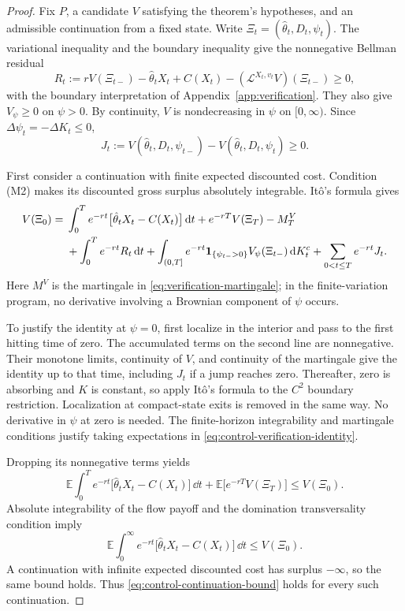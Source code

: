 \documentclass[12pt]{article}
\newcommand{\E}{\mathbb{E}}
\newcommand{\hth}{\hat\theta}
\begin{document}
\begin{proof}
Fix \(P\), a candidate \(V\) satisfying the theorem's hypotheses,
and an admissible continuation from a fixed state. Write
\(\Xi_t=(\hth_t,D_t,\psi_t)\). The variational inequality and the boundary inequality
give the nonnegative Bellman residual
\[
  R_t:=rV(\Xi_{t-})-\hth_tX_t+C(X_t)
       -(\mathcal L^{X_t,v_t}V)(\Xi_{t-})\geq0,
\]
with the boundary interpretation of
Appendix~\ref{app:verification}. They also give \(V_\psi\geq0\)
on \(\psi>0\). By continuity, \(V\) is nondecreasing in \(\psi\)
on \([0,\infty)\). Since \(\Delta\psi_t=-\Delta K_t\leq0\),
\[
  J_t:=V(\hth_t,D_t,\psi_{t-})-V(\hth_t,D_t,\psi_t)\geq0.
\]

First consider a continuation with finite expected discounted cost.
Condition (M2) makes its discounted gross surplus absolutely
integrable. It\^o's formula gives
\begin{align}
  V(\Xi_0)
  ={}&\int_0^T e^{-rt}
       \bigl[\hth_tX_t-C(X_t)\bigr]\,\dd t
       +e^{-rT}V(\Xi_T)-M_T^V \notag\\
    &+\int_0^T e^{-rt}R_t\,\dd t
       +\int_{(0,T]}e^{-rt}
          \mathbf 1_{\{\psi_{t-}>0\}}
          V_\psi(\Xi_{t-})\,\dd K_t^c
       +\sum_{0<t\leq T}e^{-rt}J_t.
  \label{eq:control-verification-identity}
\end{align}
Here \(M^V\) is the martingale in
\eqref{eq:verification-martingale}; in the finite-variation program,
no derivative involving a Brownian component of \(\psi\) occurs.

To justify the identity at \(\psi=0\), first localize in the interior
and pass to the first hitting time of zero. The accumulated terms on
the second line are nonnegative. Their monotone limits, continuity of
\(V\), and continuity of the martingale give the identity up to that
time, including \(J_t\) if a jump reaches zero. Thereafter, zero is
absorbing and \(K\) is constant, so apply It\^o's formula to the
\(C^2\) boundary restriction. Localization at compact-state exits
is removed in the same way. No derivative in \(\psi\) at zero is
needed. The finite-horizon integrability and martingale conditions
justify taking expectations in
\eqref{eq:control-verification-identity}.

Dropping its nonnegative terms yields
\[
  \E\int_0^T e^{-rt}\bigl[\hth_tX_t-C(X_t)\bigr]\,\dd t
  +\E\bigl[e^{-rT}V(\Xi_T)\bigr]
  \leq V(\Xi_0).
\]
Absolute integrability of the flow payoff and the domination
transversality condition imply
\begin{equation}\label{eq:control-continuation-bound}
  \E\int_0^\infty e^{-rt}
    \bigl[\hth_tX_t-C(X_t)\bigr]\,\dd t
  \leq V(\Xi_0).
\end{equation}
A continuation with infinite expected discounted cost has surplus
\(-\infty\), so the same bound holds. Thus \eqref{eq:control-continuation-bound} holds for every
such continuation.


\end{proof}
\end{document}
